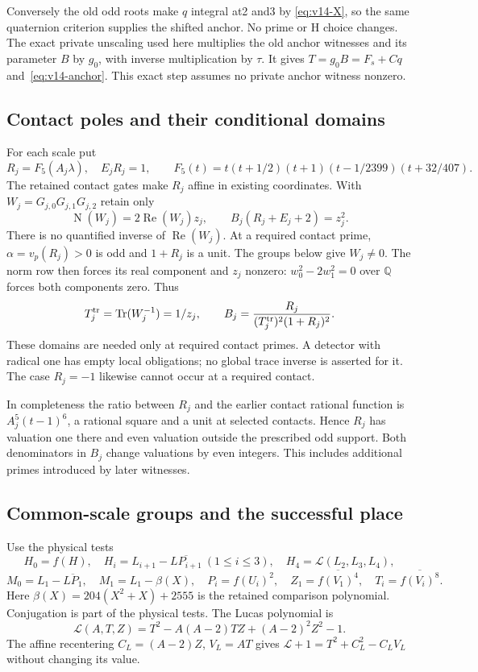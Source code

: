 Conversely the old odd roots make $q$ integral at2 and3 by
\eqref{eq:v14-X}, so the same quaternion criterion supplies the
shifted anchor. No prime or H choice changes. The exact private
unscaling used here multiplies the old anchor witnesses and its
parameter $B$ by $g_0$, with inverse multiplication by $\tau$.
It gives $T=g_0B=F_s+Cq$ and~\eqref{eq:v14-anchor}.
This exact step assumes no private anchor witness nonzero.

\subsection{Contact poles and their conditional domains}\label{subsec:v14-contact}
For each scale put
\[
 R_j=F_5(A_j\lambda),\quad E_jR_j=1,\qquad
 F_5(t)=t(t+1/2)(t+1)(t-1/2399)(t+32/407).
\]
The retained contact gates make $R_j$ affine in existing coordinates.
With $W_j=G_{j,0}G_{j,1}G_{j,2}$ retain only
\begin{equation}\label{eq:v14-pole}
 \operatorname N(W_j)=2\operatorname{Re}(W_j)z_j,\qquad
 B_j(R_j+E_j+2)=z_j^2.
\end{equation}
There is no quantified inverse of $\operatorname{Re}(W_j)$.
At a required contact prime, $\alpha=v_p(R_j)>0$ is odd
and $1+R_j$ is a unit. The groups below give $W_j\ne0$.
The norm row then forces its real component and $z_j$ nonzero:
$w_0^2-2w_1^2=0$ over $\mathbb Q$ forces both components zero.
Thus
\[
 T_j^{\rm tr}=\operatorname{Tr}(W_j^{-1})=1/z_j,\qquad
 B_j=\frac{R_j}{(T_j^{\rm tr})^2(1+R_j)^2}.
\]
These domains are needed only at required contact primes.
A detector with radical one has empty local obligations;
no global trace inverse is asserted for it. The case $R_j=-1$
likewise cannot occur at a required contact.

In completeness the ratio between $R_j$ and the earlier contact
rational function is $A_j^5(t-1)^6$, a rational square and a
unit at selected contacts. Hence $R_j$ has valuation one there
and even valuation outside the prescribed odd support.
Both denominators in $B_j$ change valuations by even integers.
This includes additional primes introduced by later witnesses.

\subsection{Common-scale groups and the successful place}\label{subsec:v14-groups}
Use the physical tests
\[
 H_0=f(H),\quad H_i=L_{i+1}-\overline{LP_{i+1}}\ (1\leq i\leq3),
 \quad H_4=\mathcal L(L_2,L_3,L_4),
\]
\[
 M_0=L_1-\overline{LP_1},\quad M_1=L_1-\beta(X),\quad
 P_i=f(U_i)^2,\quad Z_1=\overline{f(V_1)^4},\quad
 T_i=\overline{f(V_i)^8}.
\]
Here $\beta(X)=204(X^2+X)+2555$ is the retained comparison
polynomial. Conjugation is part of the physical tests.
The Lucas polynomial is
\[
 \mathcal L(A,T,Z)=T^2-A(A-2)TZ+(A-2)^2Z^2-1.
\]
The affine recentering $C_L=(A-2)Z$, $V_L=AT$ gives
$\mathcal L+1=T^2+C_L^2-C_LV_L$ without changing its value.


